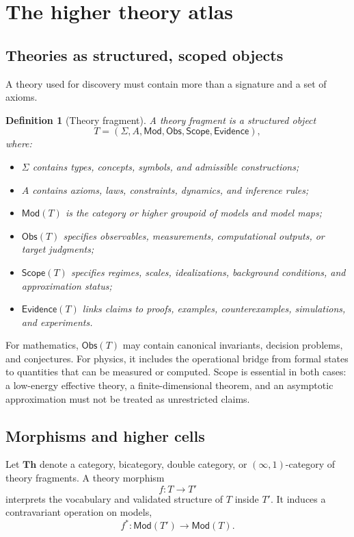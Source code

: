 \documentclass[11pt]{article}
\newtheorem{definition}{Definition}[section]
\newcommand{\Th}{\mathbf{Th}}
\newcommand{\Mod}{\mathsf{Mod}}
\newcommand{\Obs}{\mathsf{Obs}}
\newcommand{\Scope}{\mathsf{Scope}}
\newcommand{\Evidence}{\mathsf{Evidence}}
\begin{document}
\section{The higher theory atlas}

\subsection{Theories as structured, scoped objects}

A theory used for discovery must contain more than a signature and a set of axioms.

\begin{definition}[Theory fragment]
A theory fragment is a structured object
\begin{equation}
T=(\Sigma,A,\Mod,\Obs,\Scope,\Evidence),
\end{equation}
where:
\begin{itemize}
  \item $\Sigma$ contains types, concepts, symbols, and admissible constructions;
  \item $A$ contains axioms, laws, constraints, dynamics, and inference rules;
  \item $\Mod(T)$ is the category or higher groupoid of models and model maps;
  \item $\Obs(T)$ specifies observables, measurements, computational outputs, or target judgments;
  \item $\Scope(T)$ specifies regimes, scales, idealizations, background conditions, and approximation
  status;
  \item $\Evidence(T)$ links claims to proofs, examples, counterexamples, simulations, and experiments.
\end{itemize}
\end{definition}

For mathematics, $\Obs(T)$ may contain canonical invariants, decision problems, and conjectures.
For physics, it includes the operational bridge from formal states to quantities that can be measured
or computed. Scope is essential in both cases: a low-energy effective theory, a finite-dimensional
theorem, and an asymptotic approximation must not be treated as unrestricted claims.

\subsection{Morphisms and higher cells}

Let $\Th$ denote a category, bicategory, double category, or $(\infty,1)$-category of theory
fragments. A theory morphism
\begin{equation}
f:T\longrightarrow T'
\end{equation}
interprets the vocabulary and validated structure of $T$ inside $T'$. It induces a contravariant
operation on models,
\begin{equation}
f^*:\Mod(T')\longrightarrow \Mod(T).
\end{equation}
\end{document}
